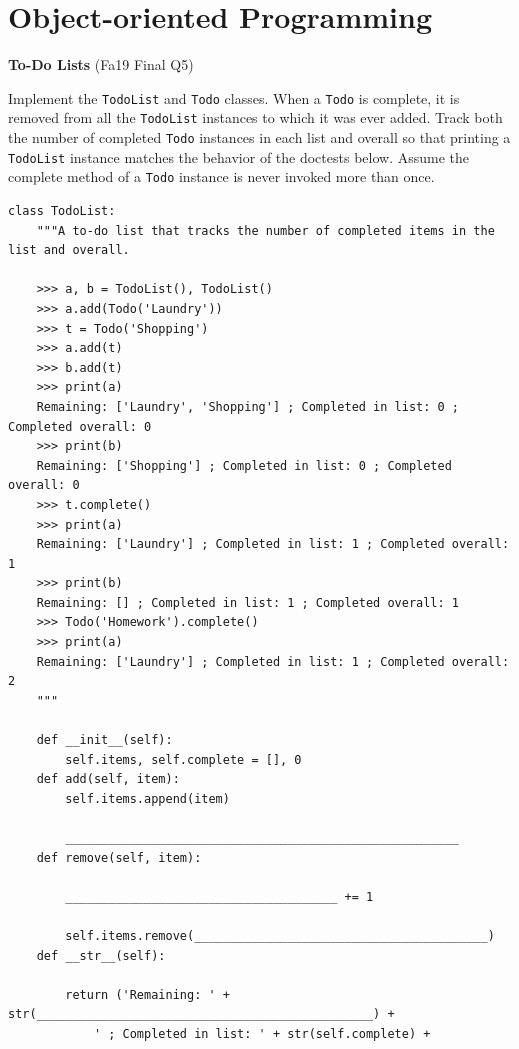 \documentclass{exam}
\newlength{\currentparskip}
\newenvironment{blocksection}
{
    \setlength{\currentparskip}{\parskip}%
    \begin{minipage}{\linewidth}
    \setlength{\parskip}{\currentparskip}%
}
{
    \end{minipage}
}
\begin{document}
\newpage
\section{Object-oriented Programming}
\begin{questions}
\begin{blocksection}
\question \textbf{To-Do Lists} (Fa19 Final Q5)

    Implement the \lstinline{TodoList} and \lstinline{Todo} classes. When a \lstinline{Todo} is complete, it is removed from all the \lstinline{TodoList} instances to which it was ever added. Track both the number of completed \lstinline{Todo} instances in each list and overall so that printing a \lstinline{TodoList} instance matches the behavior of the doctests below. Assume the complete method of a \lstinline{Todo} instance is never invoked more than once.
\end{blocksection}
\begin{blocksection}
\begin{lstlisting}
class TodoList:
    """A to-do list that tracks the number of completed items in the list and overall.

    >>> a, b = TodoList(), TodoList()
    >>> a.add(Todo('Laundry'))
    >>> t = Todo('Shopping')
    >>> a.add(t)
    >>> b.add(t)
    >>> print(a)
    Remaining: ['Laundry', 'Shopping'] ; Completed in list: 0 ; Completed overall: 0
    >>> print(b)
    Remaining: ['Shopping'] ; Completed in list: 0 ; Completed overall: 0
    >>> t.complete()
    >>> print(a)
    Remaining: ['Laundry'] ; Completed in list: 1 ; Completed overall: 1
    >>> print(b)
    Remaining: [] ; Completed in list: 1 ; Completed overall: 1
    >>> Todo('Homework').complete()
    >>> print(a)
    Remaining: ['Laundry'] ; Completed in list: 1 ; Completed overall: 2
    """
    
    def __init__(self):
        self.items, self.complete = [], 0
    def add(self, item):
        self.items.append(item)

        _______________________________________________________
    def remove(self, item):

        ______________________________________ += 1

        self.items.remove(_________________________________________)
    def __str__(self):

        return ('Remaining: ' + str(_______________________________________________) + 
            ' ; Completed in list: ' + str(self.complete) +


\end{lstlisting}
\end{blocksection}
\end{questions}
\end{document}
